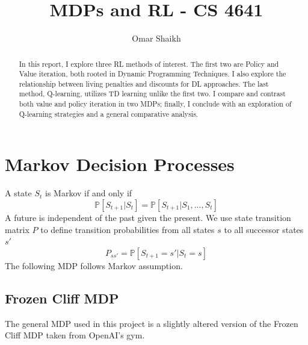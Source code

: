 \documentclass[letter]{article}
\begin{document}
\title{MDPs and RL - CS 4641}
\author{Omar Shaikh}
\maketitle

\begin{abstract}
    In this report, I explore three RL methods of interest. The first two are Policy and Value iteration, both rooted in Dynamic Programming Techniques. I also explore the relationship between living penalties and discounts for DL approaches. The last method, Q-learning, utilizes TD learning unlike the first two. I compare and contrast both value and policy iteration in two MDPs; finally, I conclude with an exploration of Q-learning strategies and a general comparative analysis.
\end{abstract}

\section{Markov Decision Processes}

A state $S_t$ is Markov if and only if
\begin{equation}
\mathbb{P}[S_{t+1}|S_t] = \mathbb{P}[S_{t+1}|S_1, ... , S_t]
\end{equation}
A future is independent of the past given the present. We use state transition matrix $P$ to define transition probabilities from all states $s$ to all successor states $s'$\autocite{Sutton:1998:IRL:551283}
\begin{equation}
P_{ss'}=\mathbb{P}[S_{t+1}=s'|S_t=s]
\end{equation}
The following MDP follows Markov assumption.

\subsection{Frozen Cliff MDP}

The general MDP used in this project is a slightly altered version of the Frozen Cliff MDP taken from OpenAI's gym\autocite{1606.01540}.  
\end{document}
